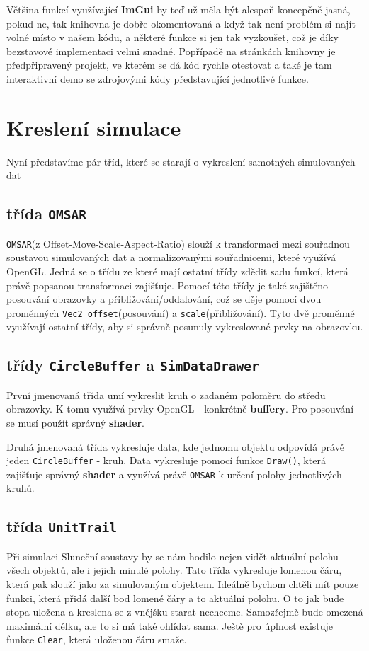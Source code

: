 Většina funkcí využívající \textbf{ImGui} by teď už měla být alespoň koncepčně jasná, pokud ne, tak knihovna je dobře okomentovaná a když tak není problém si najít volné místo v našem kódu, a některé funkce si jen tak vyzkoušet, což je díky bezstavové implementaci velmi snadné. Popřípadě na stránkách knihovny je předpřipravený projekt, ve kterém se dá kód rychle otestovat a také je tam interaktivní demo se zdrojovými kódy představující jednotlivé funkce.
\section{Kreslení simulace}
Nyní představíme pár tříd, které se starají o vykreslení samotných simulovaných dat
\subsection{třída \texttt{OMSAR}}
\texttt{OMSAR}(z Offset-Move-Scale-Aspect-Ratio) slouží k transformaci mezi souřadnou soustavou simulovaných dat a normalizovanými souřadnicemi, které využívá OpenGL. Jedná se o třídu ze které mají ostatní třídy zdědit sadu funkcí, která právě popsanou transformaci zajišťuje. Pomocí této třídy je také zajištěno posouvání obrazovky a přibližování/oddalování, což se děje pomocí dvou proměnných \texttt{Vec2 offset}(posouvání) a \texttt{scale}(přibližování). Tyto dvě proměnné využívají ostatní třídy, aby si správně posunuly vykreslované prvky na obrazovku.
\subsection{třídy \texttt{CircleBuffer} a \texttt{SimDataDrawer}} 
První jmenovaná třída umí vykreslit kruh o zadaném poloměru do středu obrazovky. K tomu využívá prvky OpenGL - konkrétně \textbf{buffery}. Pro posouvání se musí použít správný \textbf{shader}.
 
Druhá jmenovaná třída vykresluje data, kde jednomu objektu odpovídá právě jeden \texttt{CircleBuffer} - kruh. Data vykresluje pomocí funkce \texttt{Draw()}, která zajišťuje správný \textbf{shader} a využívá právě \texttt{OMSAR} k určení polohy jednotlivých kruhů.
\subsection{třída \texttt{UnitTrail}}
\label{sec:unitTrail}
Při simulaci Sluneční soustavy by se nám hodilo nejen vidět aktuální polohu všech objektů, ale i jejich minulé polohy. Tato třída vykresluje lomenou čáru, která pak slouží jako  za simulovaným objektem. Ideálně bychom chtěli mít pouze funkci, která přidá další bod lomené čáry a to aktuální polohu. O to jak bude stopa uložena a kreslena se z vnějšku starat nechceme. Samozřejmě bude omezená maximální délku, ale to si má také ohlídat sama. Ještě pro úplnost existuje funkce \texttt{Clear}, která uloženou čáru smaže.

